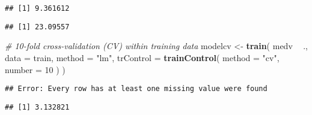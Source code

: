 \documentclass[]{article}
\newenvironment{Shaded}{\begin{snugshade}}{\end{snugshade}}
\newcommand{\CommentTok}[1]{\textcolor[rgb]{0.56,0.35,0.01}{\textit{#1}}}
\newcommand{\DataTypeTok}[1]{\textcolor[rgb]{0.13,0.29,0.53}{#1}}
\newcommand{\DecValTok}[1]{\textcolor[rgb]{0.00,0.00,0.81}{#1}}
\newcommand{\KeywordTok}[1]{\textcolor[rgb]{0.13,0.29,0.53}{\textbf{#1}}}
\newcommand{\NormalTok}[1]{#1}
\newcommand{\OperatorTok}[1]{\textcolor[rgb]{0.81,0.36,0.00}{\textbf{#1}}}
\newcommand{\StringTok}[1]{\textcolor[rgb]{0.31,0.60,0.02}{#1}}
\begin{document}
\begin{verbatim}
## [1] 9.361612
\end{verbatim}

\begin{Shaded}
\end{Shaded}

\begin{verbatim}
## [1] 23.09557
\end{verbatim}

\begin{Shaded}
\begin{Highlighting}[]
\CommentTok{# 10-fold cross-validation (CV) within training data}
\NormalTok{modelcv <-}\StringTok{ }\KeywordTok{train}\NormalTok{(}
\NormalTok{  medv }\OperatorTok{~}\StringTok{ }\NormalTok{.,}
  \DataTypeTok{data =}\NormalTok{ train,}
  \DataTypeTok{method =} \StringTok{"lm"}\NormalTok{,}
  \DataTypeTok{trControl =} \KeywordTok{trainControl}\NormalTok{(}
    \DataTypeTok{method =} \StringTok{"cv"}\NormalTok{, }\DataTypeTok{number =} \DecValTok{10}
\NormalTok{  )}
\NormalTok{)}
\end{Highlighting}
\end{Shaded}

\begin{verbatim}
## Error: Every row has at least one missing value were found
\end{verbatim}

\begin{Shaded}
\end{Shaded}

\begin{verbatim}
## [1] 3.132821
\end{verbatim}

\begin{Shaded}
\end{Shaded}
\end{document}
